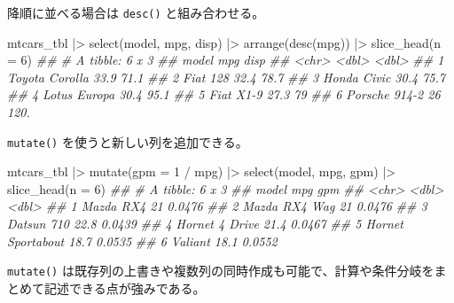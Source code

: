 \documentclass[
  letterpaper,
  xelatex,
  ja=standard, xelatex]{bxjsbook}
\newenvironment{Shaded}{\begin{snugshade}}{\end{snugshade}}
\newcommand{\AttributeTok}[1]{\textcolor[rgb]{0.40,0.45,0.13}{#1}}
\newcommand{\DecValTok}[1]{\textcolor[rgb]{0.68,0.00,0.00}{#1}}
\newcommand{\DocumentationTok}[1]{\textcolor[rgb]{0.37,0.37,0.37}{\textit{#1}}}
\newcommand{\FunctionTok}[1]{\textcolor[rgb]{0.28,0.35,0.67}{#1}}
\newcommand{\NormalTok}[1]{\textcolor[rgb]{0.00,0.23,0.31}{#1}}
\newcommand{\SpecialCharTok}[1]{\textcolor[rgb]{0.37,0.37,0.37}{#1}}
\begin{document}
降順に並べる場合は \texttt{desc()} と組み合わせる。

\begin{Shaded}
\begin{Highlighting}[]
\NormalTok{mtcars\_tbl }\SpecialCharTok{|\textgreater{}} 
  \FunctionTok{select}\NormalTok{(model, mpg, disp) }\SpecialCharTok{|\textgreater{}} 
  \FunctionTok{arrange}\NormalTok{(}\FunctionTok{desc}\NormalTok{(mpg)) }\SpecialCharTok{|\textgreater{}} 
  \FunctionTok{slice\_head}\NormalTok{(}\AttributeTok{n =} \DecValTok{6}\NormalTok{)}
\DocumentationTok{\#\# \# A tibble: 6 x 3}
\DocumentationTok{\#\#   model            mpg  disp}
\DocumentationTok{\#\#   \textless{}chr\textgreater{}          \textless{}dbl\textgreater{} \textless{}dbl\textgreater{}}
\DocumentationTok{\#\# 1 Toyota Corolla  33.9  71.1}
\DocumentationTok{\#\# 2 Fiat 128        32.4  78.7}
\DocumentationTok{\#\# 3 Honda Civic     30.4  75.7}
\DocumentationTok{\#\# 4 Lotus Europa    30.4  95.1}
\DocumentationTok{\#\# 5 Fiat X1{-}9       27.3  79  }
\DocumentationTok{\#\# 6 Porsche 914{-}2   26   120.}
\end{Highlighting}
\end{Shaded}

\texttt{mutate()} を使うと新しい列を追加できる。

\begin{Shaded}
\begin{Highlighting}[]
\NormalTok{mtcars\_tbl }\SpecialCharTok{|\textgreater{}} 
  \FunctionTok{mutate}\NormalTok{(}\AttributeTok{gpm =} \DecValTok{1} \SpecialCharTok{/}\NormalTok{ mpg) }\SpecialCharTok{|\textgreater{}} 
  \FunctionTok{select}\NormalTok{(model, mpg, gpm) }\SpecialCharTok{|\textgreater{}} 
  \FunctionTok{slice\_head}\NormalTok{(}\AttributeTok{n =} \DecValTok{6}\NormalTok{)}
\DocumentationTok{\#\# \# A tibble: 6 x 3}
\DocumentationTok{\#\#   model               mpg    gpm}
\DocumentationTok{\#\#   \textless{}chr\textgreater{}             \textless{}dbl\textgreater{}  \textless{}dbl\textgreater{}}
\DocumentationTok{\#\# 1 Mazda RX4          21   0.0476}
\DocumentationTok{\#\# 2 Mazda RX4 Wag      21   0.0476}
\DocumentationTok{\#\# 3 Datsun 710         22.8 0.0439}
\DocumentationTok{\#\# 4 Hornet 4 Drive     21.4 0.0467}
\DocumentationTok{\#\# 5 Hornet Sportabout  18.7 0.0535}
\DocumentationTok{\#\# 6 Valiant            18.1 0.0552}
\end{Highlighting}
\end{Shaded}

\texttt{mutate()}
は既存列の上書きや複数列の同時作成も可能で、計算や条件分岐をまとめて記述できる点が強みである。
\end{document}
